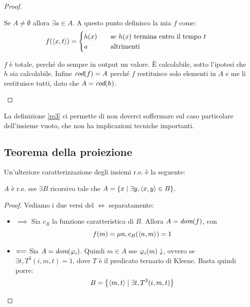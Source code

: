 \begin{proof}
\begin{itemize}
        Se $A \not= \emptyset$ allora $\exists a \in A$. A questo punto definisco la mia $f$ come:
        \begin{equation*}
            f(\langle x, t \rangle) = 
            \begin{cases}
                h(x) \quad &\text{se $h(x)$ termina entro il tempo $t$}\\
                a \quad &\text{altrimenti}
            \end{cases}
        \end{equation*}

        $f$ è totale, perché do sempre in output un valore. È calcolabile, sotto l'ipotesi che $h$
        sia calcolabile. Infine $\textit{cod}(f) = A$ perché $f$ restituisce solo elementi in $A$ e me li
        restituisce tutti, dato che $A = \textit{cod}(h)$.
    \end{itemize}
\end{proof}


La definizione \eqref{re3} ci permette di non doverci soffermare sul caso particolare dell'insieme
vuoto, che non ha implicazioni tecniche importanti.

\subsection{Teorema della proiezione}

Un'ulteriore caratterizzazione degli insiemi r.e. è la seguente:

\begin{thm}
    $A$ è r.e. sse $\exists B$ ricorsivo tale che $A = \{x \mid \exists y, \langle x, y \rangle \in B\}$.
\end{thm}
\begin{proof}
    Vediamo i due versi del $\iff$ separatamente:
    \begin{itemize}
        \item $\implies$ Sia $c_{B}$ la funzione caratteristica di $B$. Allora $A = \textit{dom}(f)$, con
        \begin{equation*}
            f(m) = \mu n, c_{B}(\langle n, m \rangle) = 1
        \end{equation*}
        \item $\Longleftarrow$ Sia $A = \textit{dom}(\varphi_{i})$. Quindi $m \in A$ sse $\varphi_{i}(m) \downarrow$, ovvero
        se $\exists t, T^{3}(i,m,t) = 1$, dove $T$ è il predicato ternario di Kleene.
        Basta quindi porre:
        \begin{equation*}
            B = \left\{\langle m, t \rangle \mid \exists t, T^{3}(i,m,t)\right\}
        \end{equation*}
    \end{itemize}
\end{proof}

